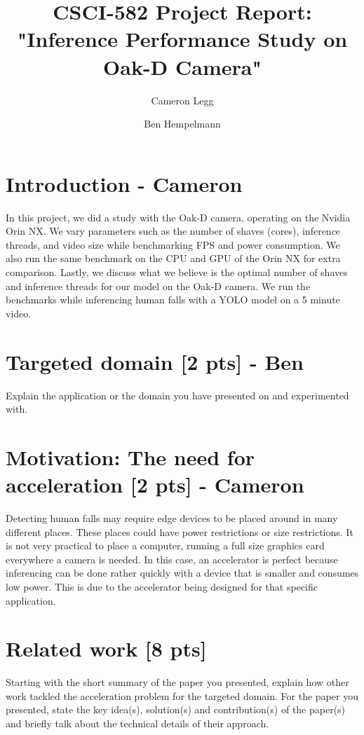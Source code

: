 \documentclass[sigconf,authorversion,nonacm]{acmart}
\begin{document}
\title{CSCI-582 Project Report: "Inference Performance Study on Oak-D Camera"}

\author{Cameron Legg}

\author{Ben Hempelmann}

\maketitle

\section{Introduction - Cameron}
In this project, we did a study with the Oak-D camera, operating on the Nvidia Orin NX. We vary parameters such as the number of shaves (cores), inference threads, and video size while benchmarking FPS and power consumption. We also run the same benchmark on the CPU and GPU of the Orin NX for extra comparison. Lastly, we discuss what we believe is the optimal number of shaves and inference threads for our model on the Oak-D camera. We run the benchmarks while inferencing human falls with a YOLO model on a 5 minute video.

\section{Targeted domain {\small [2 pts]} - Ben}
Explain the application or the domain you have presented on and experimented with. 

\section{Motivation: The need for acceleration {\small {[2 pts]}} - Cameron}

Detecting human falls may require edge devices to be placed around in many different places. These places could have power restrictions or size restrictions. It is not very practical to place a computer, running a full size graphics card everywhere a camera is needed. In this case, an accelerator is perfect because inferencing can be done rather quickly with a device that is smaller and consumes low power. This is due to the accelerator being designed for that specific application.

\section{Related work {\small {[8 pts]}}}
Starting with the short summary of the paper you presented, explain how other work tackled the acceleration problem for the targeted domain. For the paper you presented, state the key idea(s), solution(s) and contribution(s) of the paper(s) and briefly talk about the technical details of their approach.
\end{document}
